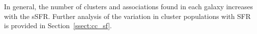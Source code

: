 \documentclass[linenumbers]{aastex63}
\begin{document}
In general, the number of clusters and associations found in each galaxy increases with the sSFR.  Further analysis of the variation in cluster populations with SFR is provided in Section~\ref{ssect:cc_sf}.

\end{document}
